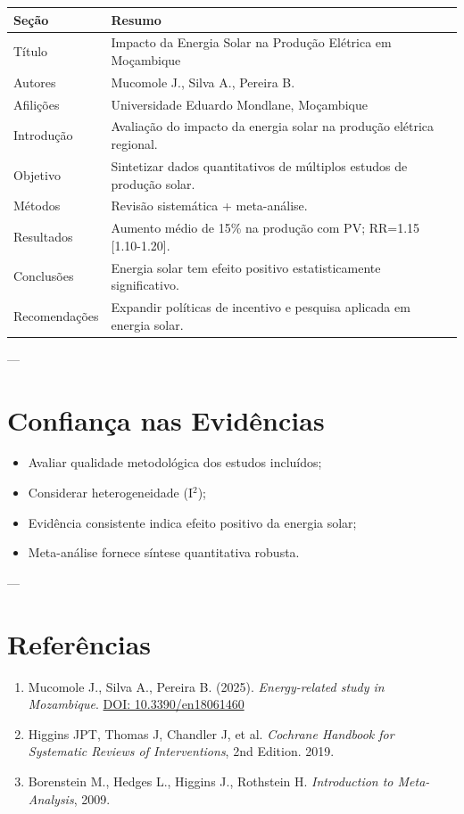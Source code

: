 \documentclass[12pt,a4paper]{article}
\begin{document}
\begin{longtable}{p{5cm} p{10cm}}
\toprule
\textbf{Seção} & \textbf{Resumo} \\
\midrule
Título & Impacto da Energia Solar na Produção Elétrica em Moçambique \\
Autores & Mucomole J., Silva A., Pereira B. \\
Afilições & Universidade Eduardo Mondlane, Moçambique \\
Introdução & Avaliação do impacto da energia solar na produção elétrica regional. \\
Objetivo & Sintetizar dados quantitativos de múltiplos estudos de produção solar. \\
Métodos & Revisão sistemática + meta-análise. \\
Resultados & Aumento médio de 15\% na produção com PV; RR=1.15 [1.10-1.20]. \\
Conclusões & Energia solar tem efeito positivo estatisticamente significativo. \\
Recomendações & Expandir políticas de incentivo e pesquisa aplicada em energia solar. \\
\bottomrule
\end{longtable}

---

\section{Confiança nas Evidências}
\begin{itemize}
    \item Avaliar qualidade metodológica dos estudos incluídos;
    \item Considerar heterogeneidade (I\(^2\));
    \item Evidência consistente indica efeito positivo da energia solar;
    \item Meta-análise fornece síntese quantitativa robusta.
\end{itemize}

---

\section*{Referências}
\begin{enumerate}
    \item Mucomole J., Silva A., Pereira B. (2025). \textit{Energy-related study in Mozambique}. \href{https://doi.org/10.3390/en18061460}{DOI: 10.3390/en18061460}
    \item Higgins JPT, Thomas J, Chandler J, et al. \textit{Cochrane Handbook for Systematic Reviews of Interventions}, 2nd Edition. 2019.
    \item Borenstein M., Hedges L., Higgins J., Rothstein H. \textit{Introduction to Meta-Analysis}, 2009.
\end{enumerate}
\end{document}
